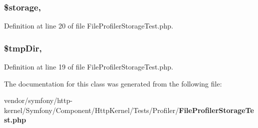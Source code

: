 \subsubsection[{\$storage}]{\setlength{\rightskip}{0pt plus 5cm}\$storage\hspace{0.3cm}{\ttfamily [static]}, {\ttfamily [protected]}}\label{class_symfony_1_1_component_1_1_http_kernel_1_1_tests_1_1_profiler_1_1_file_profiler_storage_test_a23658d9b796eebdea4cee5c9f0046894}


Definition at line 20 of file File\+Profiler\+Storage\+Test.\+php.

\subsubsection[{\$tmp\+Dir}]{\setlength{\rightskip}{0pt plus 5cm}\$tmp\+Dir\hspace{0.3cm}{\ttfamily [static]}, {\ttfamily [protected]}}\label{class_symfony_1_1_component_1_1_http_kernel_1_1_tests_1_1_profiler_1_1_file_profiler_storage_test_aee4c6edab40be8352c6f5aa453437f6b}


Definition at line 19 of file File\+Profiler\+Storage\+Test.\+php.



The documentation for this class was generated from the following file\+:\begin{DoxyCompactItemize}
\item 
vendor/symfony/http-\/kernel/\+Symfony/\+Component/\+Http\+Kernel/\+Tests/\+Profiler/{\bf File\+Profiler\+Storage\+Test.\+php}\end{DoxyCompactItemize}
